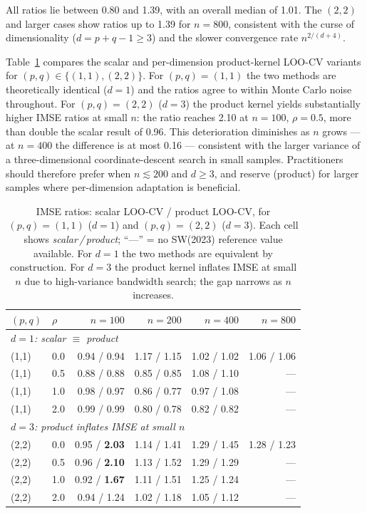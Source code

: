 \documentclass[article]{jss}
\begin{document}
All ratios lie between 0.80 and 1.39, with an overall median of 1.01.
The $(2,2)$ and larger cases show ratios up to 1.39 for $n=800$,
consistent with the curse of dimensionality ($d = p+q-1 \geq 3$) and the
slower convergence rate $n^{2/(d+4)}$.

Table~\ref{tab:bw_compare} compares the scalar and per-dimension
product-kernel LOO-CV variants for $(p,q) \in \{(1,1),(2,2)\}$.
For $(p,q)=(1,1)$ the two methods are theoretically identical ($d=1$)
and the ratios agree to within Monte Carlo noise throughout.
For $(p,q)=(2,2)$ ($d=3$) the product kernel yields substantially
higher IMSE ratios at small $n$: the ratio reaches 2.10 at $n=100$,
$\rho=0.5$, more than double the scalar result of 0.96.
This deterioration diminishes as $n$ grows --- at $n=400$ the
difference is at most 0.16 --- consistent with the larger variance
of a three-dimensional coordinate-descent search in small samples.
Practitioners should therefore prefer  when
$n \lesssim 200$ and $d \geq 3$, and reserve  (product)
for larger samples where per-dimension adaptation is beneficial.

\begin{table}[t!]
\centering
\caption{\label{tab:bw_compare}%
  IMSE ratios: scalar LOO-CV / product LOO-CV, for $(p,q)=(1,1)$
  ($d=1$) and $(p,q)=(2,2)$ ($d=3$).
  Each cell shows \textit{scalar\,/\,product}; ``---'' = no SW(2023)
  reference value available.
  For $d=1$ the two methods are equivalent by construction.
  For $d=3$ the product kernel inflates IMSE at small $n$ due to
  high-variance bandwidth search; the gap narrows as $n$ increases.}
\smallskip\small
\begin{tabular}{llrrrr}
\toprule
$(p,q)$ & $\rho$ & $n=100$ & $n=200$ & $n=400$ & $n=800$ \\
\midrule
\multicolumn{6}{l}{\textit{$d=1$: scalar $\equiv$ product}} \\
(1,1) & 0.0 & 0.94 / 0.94 & 1.17 / 1.15 & 1.02 / 1.02 & 1.06 / 1.06 \\
(1,1) & 0.5 & 0.88 / 0.88 & 0.85 / 0.85 & 1.08 / 1.10 & --- \\
(1,1) & 1.0 & 0.98 / 0.97 & 0.86 / 0.77 & 0.97 / 1.08 & --- \\
(1,1) & 2.0 & 0.99 / 0.99 & 0.80 / 0.78 & 0.82 / 0.82 & --- \\
\midrule
\multicolumn{6}{l}{\textit{$d=3$: product inflates IMSE at small $n$}} \\
(2,2) & 0.0 & 0.95 / \textbf{2.03} & 1.14 / 1.41 & 1.29 / 1.45 & 1.28 / 1.23 \\
(2,2) & 0.5 & 0.96 / \textbf{2.10} & 1.13 / 1.52 & 1.29 / 1.29 & --- \\
(2,2) & 1.0 & 0.92 / \textbf{1.67} & 1.11 / 1.51 & 1.25 / 1.24 & --- \\
(2,2) & 2.0 & 0.94 / 1.24 & 1.02 / 1.18 & 1.05 / 1.12 & --- \\
\bottomrule
\end{tabular}
\end{table}
\end{document}
